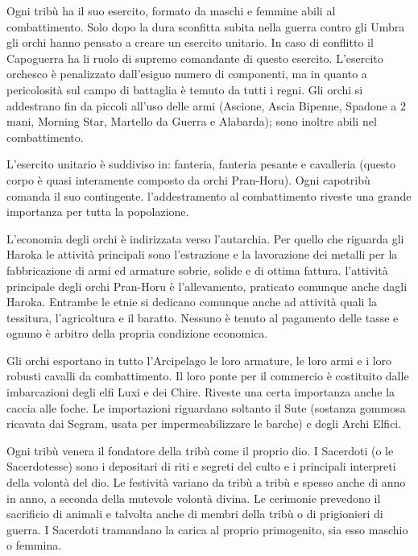 \Esercito Ogni trib\`u ha il suo esercito, formato da maschi e femmine abili
al combattimento. Solo dopo la dura sconfitta subita nella guerra
contro gli Umbra gli orchi hanno pensato a creare un esercito
unitario. In caso di conflitto il Capoguerra ha li ruolo di supremo
comandante di questo esercito.  L'esercito orchesco \`e penalizzato
dall'esiguo numero di componenti, ma in quanto a pericolosit\`a sul
campo di battaglia \`e temuto da tutti i regni. Gli orchi si
addestrano fin da piccoli all'uso delle armi (Ascione, Ascia Bipenne,
Spadone a 2 mani, Morning Star, Martello da Guerra e Alabarda); sono
inoltre abili nel combattimento.

L'esercito unitario \`e suddiviso in: fanteria, fanteria pesante e
cavalleria (questo corpo \`e quasi interamente composto da orchi
Pran-Horu). Ogni capotrib\`u comanda il suo contingente.
l'addestramento al combattimento riveste una grande importanza per
tutta la popolazione.

\Economia L'economia degli orchi \`e indirizzata verso l'autarchia. Per quello
che riguarda gli Haroka le attivit\`a principali sono l'estrazione e
la lavorazione dei metalli per la fabbricazione di armi ed armature
sobrie, solide e di ottima fattura. l'attivit\`a principale degli
orchi Pran-Horu \`e l'allevamento, praticato comunque anche dagli
Haroka.  Entrambe le etnie si dedicano comunque anche ad attivit\`a
quali la tessitura, l'agricoltura e il baratto. Nessuno \`e tenuto
al pagamento delle tasse e ognuno \`e arbitro della propria
condizione economica. 

Gli orchi esportano in tutto l'Arcipelago le loro armature, le loro
armi e i loro robusti cavalli da combattimento.  Il loro ponte per il
commercio \`e costituito dalle imbarcazioni degli elfi Luxi e dei
Chire. Riveste una certa importanza anche la caccia alle foche. Le
importazioni riguardano soltanto il Sute (sostanza
gommosa ricavata dai Segram, usata per impermeabilizzare le barche) e
degli Archi Elfici.

\Religione Ogni trib\`u venera il fondatore della trib\`u come il proprio
dio. I Sacerdoti (o le Sacerdotesse) sono i depositari di riti e
segreti del culto e i principali interpreti della volont\`a del dio.
Le festivit\`a variano da trib\`u a trib\`u e spesso anche di
anno in anno, a seconda della mutevole volont\`a divina. Le
cerimonie prevedono il sacrificio di animali e talvolta anche di
membri della trib\`u o di prigionieri di guerra. I Sacerdoti
tramandano la carica al proprio primogenito, sia esso maschio o
femmina.

